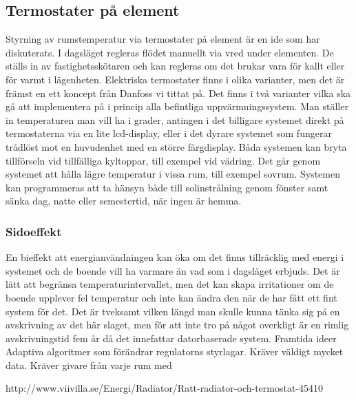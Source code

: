 \subsection{Termostater på element}
Styrning av rumstemperatur via termostater på element är en ide som har diskuterats. I dagsläget regleras flödet manuellt via vred under elementen. De ställs in av fastighetsskötaren och kan regleras om det brukar vara för kallt eller för varmt i lägenheten. 
Elektriska termostater finns i olika varianter, men det är främst en ett koncept från Danfoss vi tittat på. Det finns i två varianter vilka ska gå att implementera på i princip alla befintliga uppvärmningssystem. Man ställer in temperaturen man vill ha i grader, antingen i det billigare systemet direkt på termostaterna via en lite lcd-display, eller i det dyrare systemet som fungerar trådlöst mot en huvudenhet med en större färgdisplay. 
Båda systemen kan bryta tillförseln vid tillfälliga kyltoppar, till exempel vid vädring. Det går genom systemet att hålla lägre temperatur i vissa rum, till exempel sovrum. Systemen kan programmeras att ta hänsyn både till solinstrålning genom fönster samt sänka dag, natte eller semestertid, när ingen är hemma.
\subsubsection{Sidoeffekt}
En bieffekt att energianvändningen kan öka om det finns tillräcklig med energi i systemet och de boende vill ha varmare än vad som i dagsläget erbjuds. Det är lätt att begränsa temperaturintervallet, men det kan skapa irritationer om de boende upplever fel temperatur och inte kan ändra den när de har fått ett fint system för det.
\Ekonomi
Det är tveksamt vilken längd man skulle kunna tänka sig på en avskrivning av det här slaget, men för att inte tro på något overkligt är en rimlig avskrivningstid fem år då det innefattar datorbaserade system.
Framtida ideer
Adaptiva algoritmer som förändrar regulatorns styrlagar. Kräver väldigt mycket data. Kräver givare från varje rum med 

http://www.viivilla.se/Energi/Radiator/Ratt-radiator-och-termostat-45410
 


